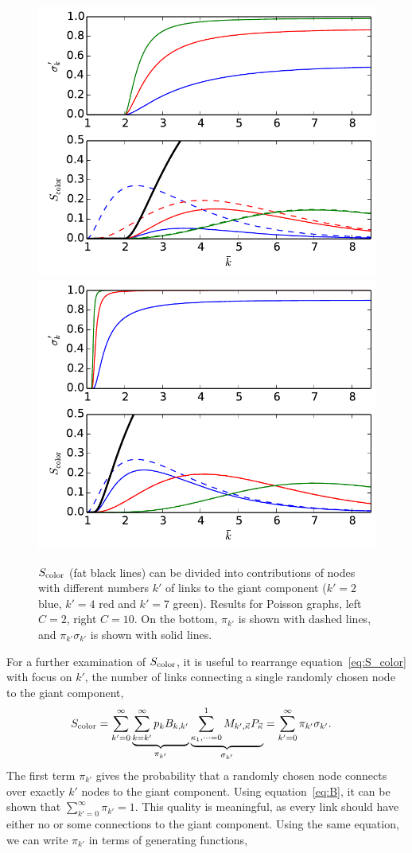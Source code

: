 \documentclass[aps, pre, onecolumn, a4paper, floatfix]{revtex4}
\begin{document}
\begin{figure}[htb]
    \includegraphics[width=0.45\columnwidth]{cross_over_3_C2.pdf}
    \includegraphics[width=0.45\columnwidth]{cross_over_3_C10.pdf}\\
    \caption{$S_{\rm color}$ (fat black lines) can be divided into contributions of nodes 
    with different numbers $k'$ of links to the giant component ($k'=2$ blue, $k'=4$ red and $k'=7$ green).
    Results for Poisson graphs, left $C=2$, right $C=10$. On the bottom, $\pi_{k'}$ is shown with dashed lines, 
    and $\pi_{k'}\sigma_{k'}$ is shown with solid lines.}
    \label{fig:decomposition}
\end{figure}
%
For a further examination of $S_{\rm color}$, 
it is useful to rearrange equation~\ref{eq:S_color} with focus on $k'$, 
the number of links connecting a single randomly chosen node to the giant component, 
\begin{align}
S_{\rm color} &= \sum_{k'=0}^{\infty} \underbrace{\sum_{k=k'}^{\infty} p_k B_{k,k'}}_{\pi_{k'}}
\underbrace{{\sum_{\kappa_1,\dots=0}^1 M_{k',\vec \kappa} P_{\vec \kappa}}}_{\sigma_{k'}}
 = \sum_{k'=0}^{\infty} \pi_{k'}\sigma_{k'}.\label{eq:decomposition}
\end{align}
The first term $\pi_{k'}$ gives the probability that a randomly chosen node 
connects over exactly $k'$ nodes to the giant component. 
Using equation~\ref{eq:B}, it can be shown that $\sum_{k'=0}^{\infty}\pi_{k'}=1$. 
This quality is meaningful, as every link should have 
either no or some connections to the giant component. 
Using the same equation, we can write $\pi_{k'}$ in terms of generating functions, 
\end{document}
